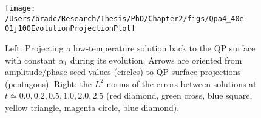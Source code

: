 \documentclass[../PhD.tex]{subfiles}
\begin{document}

\begin{figure}[ht]
	\centering
	\texttt{[image: /Users/bradc/Research/Thesis/PhD/Chapter2/figs/Qpa4\_40e-01j100EvolutionProjectionPlot]}
	\caption[Taking the spectrum of a QP solution during evolution to use as a seed to find new QP solutions]{Left: Projecting a low-temperature solution back to the QP surface with constant $\alpha_1$ during its evolution. Arrows are oriented from amplitude/phase seed values (circles) to QP surface projections (pentagons). Right: the $L^2$-norms of the errors between  solutions at $t\simeq 0.0, 0.2, 0.5, 1.0, 2.0, 2.5$ (red diamond, green cross, blue square, yellow triangle, magenta circle, blue diamond).}
	\label{fig: Qpa4_40e-01j100EvolutionProjection}
\end{figure}

\end{document}
